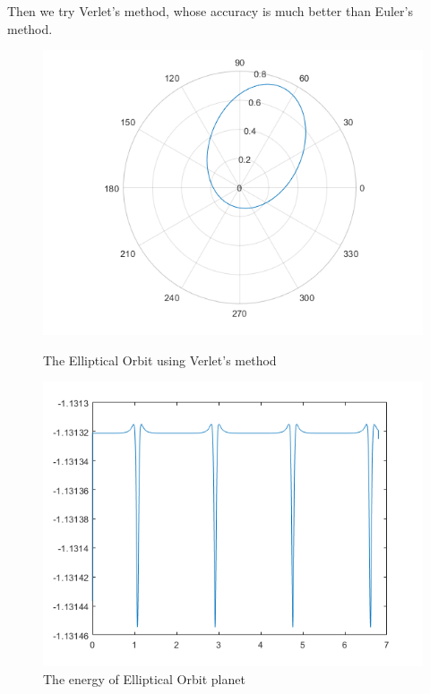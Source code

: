 \documentclass{article}
\begin{document}
Then we try Verlet's method, whose accuracy is much better than Euler's method.
\begin{figure}[htbp]
    \centering
    \begin{minipage}{0.45\linewidth}
        \centering
        \includegraphics[width=0.8\linewidth]{br2.png}
        \caption{The Elliptical Orbit using Verlet's method}
    \end{minipage}
    \hfill
    \begin{minipage}{0.45\linewidth}
        \centering
        \includegraphics[width=0.8\linewidth]{br21.png}
        \caption{The energy of Elliptical Orbit planet}
    \end{minipage}
\end{figure}
\end{document}
